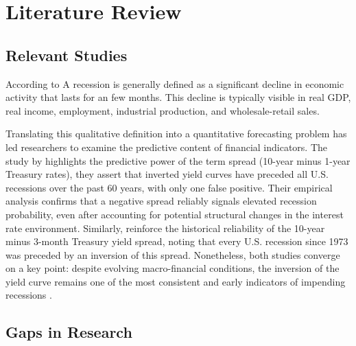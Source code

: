 

\section{Literature Review}

\subsection{Relevant Studies}

According to \textcite{NBERRecession}
A recession is generally defined as a significant decline in economic activity that lasts for an few months. This decline is typically visible in real GDP, real income, employment, industrial production, and wholesale-retail sales.

Translating this qualitative definition into a quantitative forecasting problem has led researchers to examine the predictive content of financial indicators. %
The study by \textcite{bauer2018economic} highlights the predictive power of the term spread (10-year minus 1-year Treasury rates), they assert that inverted yield curves have preceded all U.S. recessions over the past 60 years, with only one false positive. Their empirical analysis confirms that a negative spread reliably signals elevated recession probability, even after accounting for potential structural changes in the interest rate environment.
Similarly, \textcite{aramonte2019yield} reinforce the historical reliability of the 10-year minus 3-month Treasury yield spread, noting that every U.S. recession since 1973 was preceded by an inversion of this spread. %
Nonetheless, both studies converge on a key point: despite evolving macro-financial conditions, the inversion of the yield curve remains one of the most consistent and early indicators of impending recessions \parencite{bauer2018economic, aramonte2019yield}.
    


\subsection{Gaps in Research}

